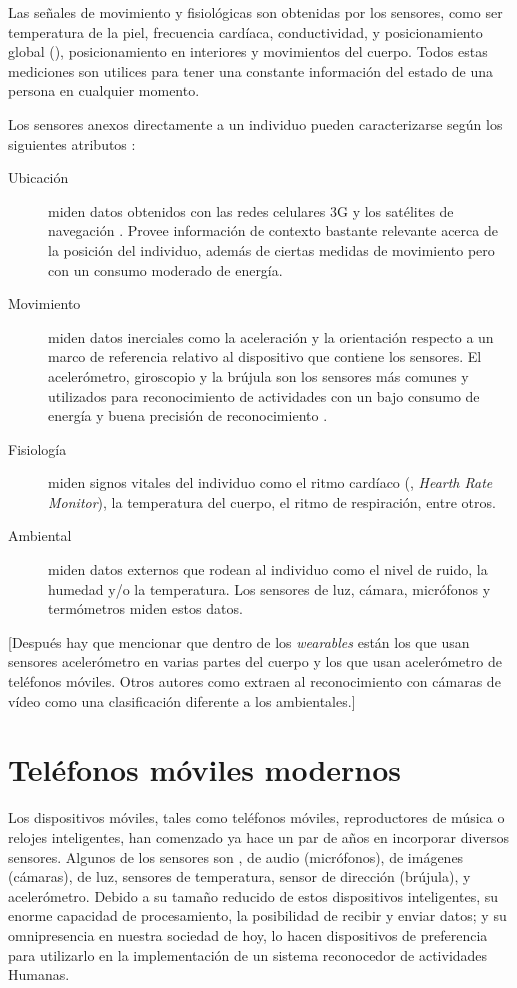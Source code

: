 Las señales de movimiento y fisiológicas son obtenidas por los sensores,
como ser temperatura de la piel, frecuencia cardíaca, conductividad,
y posicionamiento global (), posicionamiento en interiores
y movimientos del cuerpo. Todos estas mediciones son utilices para
tener una constante información del estado de una persona en cualquier
momento.

Los sensores anexos directamente a un individuo pueden caracterizarse
según los siguientes atributos \cite{LaraLabrador2013}:
\begin{description}
\item [{Ubicación}] miden datos obtenidos con las redes celulares 3G y
los satélites de navegación . Provee información de contexto
bastante relevante acerca de la posición del individuo, además de
ciertas medidas de movimiento pero con un consumo moderado de energía.
\item [{Movimiento}] miden datos inerciales como la aceleración y la orientación
respecto a un marco de referencia relativo al dispositivo que contiene
los sensores. El acelerómetro, giroscopio y la brújula son los sensores
más comunes y utilizados para reconocimiento de actividades con un
bajo consumo de energía y buena precisión de reconocimiento \cite{Bao2004,LaraLabrador2012}.
\item [{Fisiología}] miden signos vitales del individuo como el ritmo cardíaco
(, \emph{Hearth Rate Monitor}), la temperatura del cuerpo,
el ritmo de respiración, entre otros.
\item [{Ambiental}] miden datos externos que rodean al individuo como el
nivel de ruido, la humedad y/o la temperatura. Los sensores de luz,
cámara, micrófonos y termómetros miden estos datos. 
\end{description}
{[}Después hay que mencionar que dentro de los \emph{wearables} están
los que usan sensores acelerómetro en varias partes del cuerpo y los
que usan acelerómetro de teléfonos móviles. Otros autores como \cite{karmul2010}
extraen al reconocimiento con cámaras de vídeo como una clasificación
diferente a los ambientales.{]}

\section{Teléfonos móviles modernos}

\label{sec24:dispositivos-moviles} Los dispositivos móviles, tales
como teléfonos móviles, reproductores de música o relojes inteligentes,
han comenzado ya hace un par de años en incorporar diversos sensores.
Algunos de los sensores son , de audio (micrófonos), de
imágenes (cámaras), de luz, sensores de temperatura, sensor de dirección
(brújula), y acelerómetro. Debido a su tamaño reducido de estos dispositivos
inteligentes, su enorme capacidad de procesamiento, la posibilidad
de recibir y enviar datos; y su omnipresencia en nuestra sociedad
de hoy, lo hacen dispositivos de preferencia para utilizarlo en la
implementación de un sistema reconocedor de actividades Humanas.

